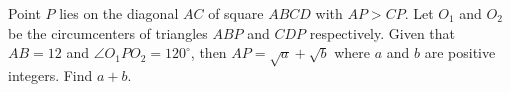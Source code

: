 Point $P$ lies on the diagonal $AC$ of square $ABCD$ with $AP>CP$. Let $O_1$ and $O_2$ be the circumcenters of triangles $ABP$ and $CDP$ respectively. Given that $AB=12$ and $\angle O_1 P O_2 = 120^\circ$, then $AP=\sqrt{a}+\sqrt{b}$ where $a$ and $b$ are positive integers. Find $a+b$.